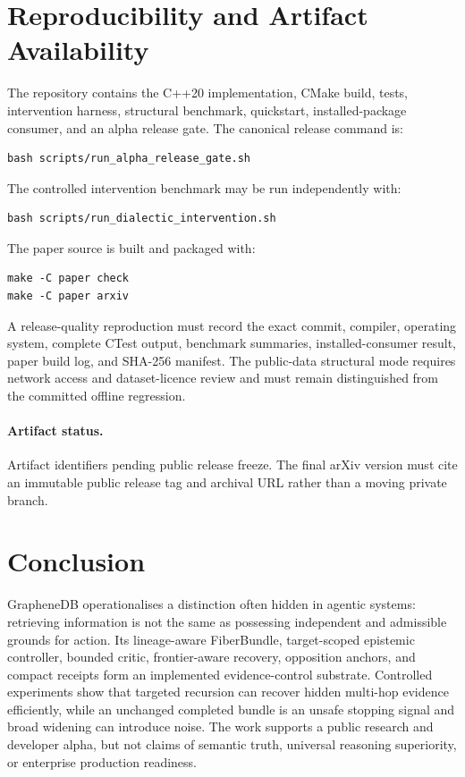 \documentclass[10pt]{article}
\newcommand{\artifactstatus}{Artifact identifiers pending public release freeze}
\begin{document}
\section{Reproducibility and Artifact Availability}
The repository contains the C++20 implementation, CMake build, tests, intervention harness, structural benchmark, quickstart, installed-package consumer, and an alpha release gate. The canonical release command is:
\begin{verbatim}
bash scripts/run_alpha_release_gate.sh
\end{verbatim}
The controlled intervention benchmark may be run independently with:
\begin{verbatim}
bash scripts/run_dialectic_intervention.sh
\end{verbatim}
The paper source is built and packaged with:
\begin{verbatim}
make -C paper check
make -C paper arxiv
\end{verbatim}
A release-quality reproduction must record the exact commit, compiler, operating system, complete CTest output, benchmark summaries, installed-consumer result, paper build log, and SHA-256 manifest. The public-data structural mode requires network access and dataset-licence review and must remain distinguished from the committed offline regression.

\paragraph{Artifact status.} \artifactstatus. The final arXiv version must cite an immutable public release tag and archival URL rather than a moving private branch.

\section{Conclusion}
GrapheneDB operationalises a distinction often hidden in agentic systems: retrieving information is not the same as possessing independent and admissible grounds for action. Its lineage-aware FiberBundle, target-scoped epistemic controller, bounded critic, frontier-aware recovery, opposition anchors, and compact receipts form an implemented evidence-control substrate. Controlled experiments show that targeted recursion can recover hidden multi-hop evidence efficiently, while an unchanged completed bundle is an unsafe stopping signal and broad widening can introduce noise. The work supports a public research and developer alpha, but not claims of semantic truth, universal reasoning superiority, or enterprise production readiness.
\end{document}

